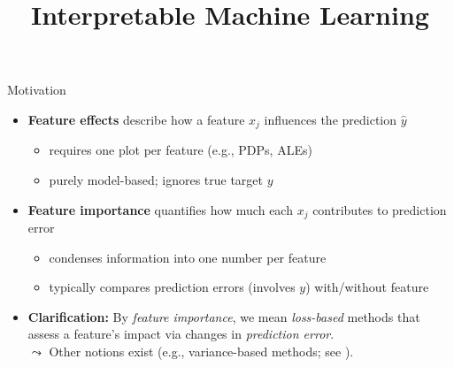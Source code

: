 \documentclass[10pt,compress,t,notes=noshow, xcolor=table]{beamer}
\title{Interpretable Machine Learning}
\date{}
\begin{document}
	
	
	

	

\begin{frame}{Motivation}
\begin{itemize}
  \item<1-3> \textbf{Feature effects} describe how a feature $x_j$ influences the prediction $\hat{y}$
  \begin{itemize}
    \item requires one plot per feature (e.g., PDPs, ALEs)
    \item purely model-based; ignores true target $y$ %
  \end{itemize}
  \item<2-3> \textbf{Feature importance} quantifies how much each $x_j$ contributes to prediction error%
  \begin{itemize}
    \item condenses information into one number per feature
    \item typically compares prediction errors (involves $y$) with/without feature
  \end{itemize}
  \item<3> \textbf{Clarification:} By \emph{feature importance}, we mean \emph{loss-based} methods that assess a feature's impact via changes in \emph{prediction error}. \\
  $\leadsto$
  Other notions exist (e.g., variance-based methods; see ).
\end{itemize}
\end{frame}
\end{document}
